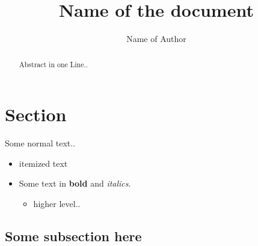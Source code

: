 \documentclass[journal,onecolumn]{IEEEtrancz}
\begin{document}
\title{Name of the document}
\author{Name of Author}

\maketitle

\begin{abstract}
	Abstract in one Line..
\end{abstract}

\IEEEpeerreviewmaketitle



\section{Section}
Some normal text..

\begin{itemize}
	\item itemized text
	\item Some text in \textbf{bold} and \textit{italics}.
	\begin{itemize}
		\item higher level..

\end{itemize}
\end{itemize}
\subsection{Some subsection here}
\end{document}
